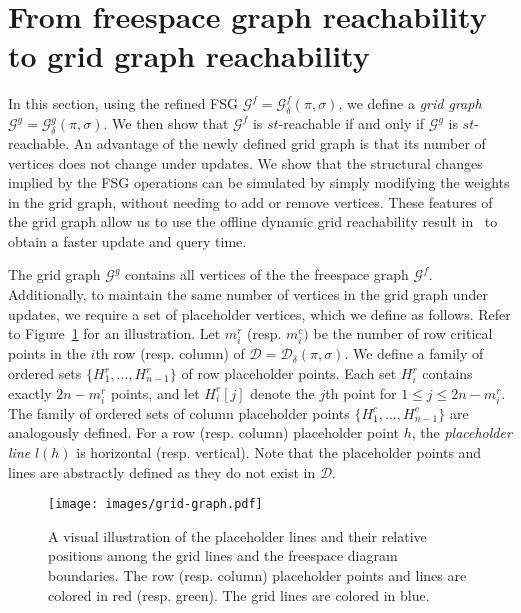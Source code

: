 \documentclass[thm-restate]{lipics-v2021}
\theoremstyle{remark}
\newcommand{\graph}[0]{\mathcal{G}}
\newcommand{\fd}[2]{\mathcal{D}_{#2}(#1)}
\newcommand{\D}{\mathcal{D}}
\newcommand{\fsgraph}[0]{\graph^{f}}
\newcommand{\ggraph}[0]{\graph^g}
\begin{document}
\section{From freespace graph reachability to grid graph reachability} \label{sec:fsg-to-gg}
In this section, using the refined FSG $\fsgraph = \fsgraph_\delta(\pi, \sigma)$, we define a \emph{grid graph} $\ggraph = \ggraph_\delta(\pi, \sigma)$. We then show that $\fsgraph$ is $st$-reachable if and only if $\ggraph$ is $st$-reachable. An advantage of the newly defined grid graph is that its number of vertices does not change under updates. We show that the structural changes implied by the FSG operations can be simulated by simply modifying the weights in the grid graph, without needing to add or remove vertices. These features of the grid graph allow us to use the offline dynamic grid reachability result in~\cite{bringmannFrechetDistanceTranslation2021} to obtain a faster update and query time.

The grid graph $\ggraph$ contains all vertices of the the freespace graph $\fsgraph$. Additionally, to maintain the same number of vertices in the grid graph under updates, we require a set of placeholder vertices, which we define as follows. Refer to Figure~\ref{fig:grid-graph} for an illustration. Let $m^r_i$ (resp. $m^c_i)$ be the number of row critical points in the $i$th row (resp. column) of $\D = \fd{\pi, \sigma}{\delta}$. We define a family of ordered sets $\{H^r_1, ..., H^r_{n - 1}\}$ of row placeholder points. Each set $H^r_i$ contains exactly $2n - m^r_i$ points, and let $H^r_i[j]$ denote the $j$th point for $1 \leq j \leq 2n - m^r_i$. The family of ordered sets of column placeholder points $\{H^c_1, ..., H^c_{n - 1}\}$ are analogously defined. For a row (resp. column) placeholder point $h$, the \emph{placeholder line} $l(h)$ is horizontal (resp. vertical). Note that the placeholder points and lines are abstractly defined as they do not exist in $\D$. 

\begin{figure}[tbh]
    \centering
    \texttt{[image: images/grid-graph.pdf]}
    \caption{A visual illustration of the placeholder lines and their relative positions among the grid lines and the freespace diagram boundaries. The row (resp. column) placeholder points and lines are colored in red (resp. green). The grid lines are colored in blue.}
    \label{fig:grid-graph}
\end{figure}
\end{document}
